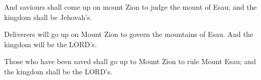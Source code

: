 			\begin{versebox}
					\item[BHS] 
					\item[LXX] 
					\item[ASV] And saviours shall come up on mount Zion to judge the mount of Esau; and the kingdom shall be Jehovah's.
					\item[NIV] Deliverers will go up on Mount Zion to govern the mountains of Esau. And the kingdom will be the LORD’s.
					\item[NRSV] Those who have been saved shall go up to Mount Zion to rule Mount Esau; and the kingdom shall be the LORD’s.
			\end{versebox}
